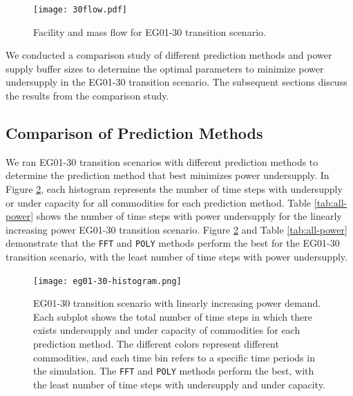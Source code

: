\begin{figure}[]
    \centering
    \texttt{[image: 30flow.pdf]} 
    \caption{Facility and mass flow for EG01-30 transition scenario.}
    \label{fig:30flow}
\end{figure}

We conducted a comparison study of different prediction 
methods and power supply buffer sizes to determine the 
optimal \deploy parameters to minimize 
power undersupply in the EG01-30 \Cyclus 
transition scenario. 
The subsequent sections discuss the results from the comparison 
study. 

\subsection{Comparison of Prediction Methods}
We ran EG01-30 transition scenarios with different prediction 
methods to determine the prediction method that best minimizes 
power undersupply. 
In Figure \ref{fig:eg30under}, each histogram represents 
the number of time steps with undersupply or 
under capacity for all commodities for each prediction method.  
Table \ref{tab:all-power} shows the number of time steps with power 
undersupply for the linearly increasing power EG01-30 transition scenario. 
Figure \ref{fig:eg30under} and Table \ref{tab:all-power}
demonstrate that the \texttt{FFT} and \texttt{POLY} methods 
perform the best for the EG01-30 transition scenario, 
with the least number of time steps with power undersupply.

\begin{figure}[]
	\centering
	\texttt{[image: eg01-30-histogram.png]} 
	\caption{
	EG01-30 transition scenario with linearly increasing power demand. 
	Each subplot shows the total number of time steps in which there exists 
	undersupply and under capacity of commodities for each prediction method. 
	The different colors represent different commodities, and each time bin 
	refers to a specific time periods in the simulation.
    The \texttt{FFT} and \texttt{POLY} methods perform the best, 
    with the least number of 
	time steps with undersupply and under capacity.}
	\label{fig:eg30under}
\end{figure}

